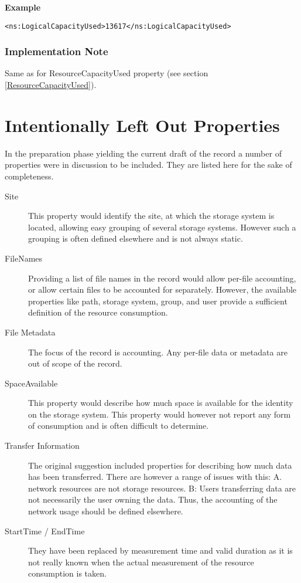 {\bf Example}
\begin{verbatim}
<ns:LogicalCapacityUsed>13617</ns:LogicalCapacityUsed>
\end{verbatim}

\subsubsection*{Implementation Note}

Same as for ResourceCapacityUsed property 
(see section \ref{ResourceCapacityUsed}).


\section{Intentionally Left Out Properties}

In the preparation phase yielding the current draft of the record a number of
properties were in discussion to be included. They are listed here for the sake 
of completeness.

\begin{description}

\item[Site] This property would identify the site, at which the storage system
is located, allowing easy grouping of several storage systems. However such a
grouping is often defined elsewhere and is not always static.

\item[FileNames] Providing a list of file names in the record would allow
per-file accounting, or allow certain files to be accounted for separately.
However, the available properties like path, storage system, group, and 
user provide a sufficient definition of the resource consumption.

\item[File Metadata] The focus of the record is accounting. Any per-file data
or metadata are out of scope of the record.

\item[SpaceAvailable] This property would describe how much space is available
for the identity on the storage system. This property would however not report
any form of consumption and is often difficult to determine.

\item[Transfer Information] The original suggestion included properties for
describing how much data has been transferred. There are however a range of
issues with this: A. network resources are not storage resources. B: Users
transferring data are not necessarily the user owning the data. Thus, the  
accounting of the network usage should be defined elsewhere.

\item[StartTime / EndTime] They have been replaced by measurement time and 
valid duration as it is not really known when the actual measurement of the 
resource consumption is taken.

\end{description}

